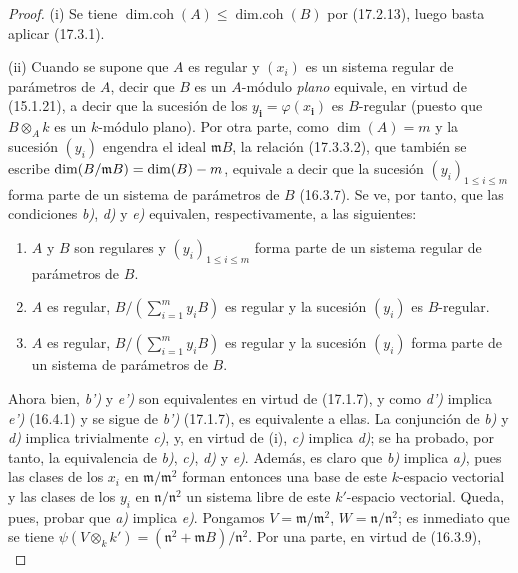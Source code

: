 \begin{proof}
\textnormal{(i)} Se tiene
$\operatorname{dim.coh}(A)\leq\operatorname{dim.coh}(B)$ por (17.2.13), luego
basta aplicar (17.3.1).

\textnormal{(ii)} Cuando se supone que $A$ es regular y $(x_i)$ es un sistema
regular de parámetros de $A$, decir que $B$ es un $A$-módulo \emph{plano}
equivale, en virtud de (15.1.21), a decir que la sucesión de los
$y_{\boldsymbol{i}}=\varphi(x_{\boldsymbol{i}})$ es $B$-regular (puesto que $B\otimes_A k$ es un
$k$-módulo plano). Por otra parte, como $\dim(A)=m$ y la sucesión $(y_i)$
engendra el ideal $\mathfrak{m}B$, la relación (17.3.3.2), que también se
escribe $\dim(B/\mathfrak{m}B)=\dim(B)- m$, equivale a decir que la sucesión
$(y_i)_{1\leq i\leq m}$ forma parte de un sistema de parámetros de $B$
(16.3.7). Se ve, por tanto, que las condiciones \emph{b)}, \emph{d)} y \emph{e)} equivalen,
respectivamente, a las siguientes:
\begin{enumerate}
  \item[\textit{b')}] $A$ y $B$ son regulares y $(y_i)_{1\leq i\leq m}$ forma
  parte de un sistema regular de parámetros de $B$.
  \item[\textit{d')}] $A$ es regular,
  $B/(\sum_{i=1}^m y_iB)$ es regular y la sucesión $(y_i)$ es
  $B$-regular.
  \item[\textit{e')}] $A$ es regular,
  $B/(\sum_{i=1}^m y_iB)$ es regular y la sucesión $(y_i)$ forma parte de un
  sistema de parámetros de $B$.
\end{enumerate}
Ahora bien, \emph{b')} y \emph{e')} son equivalentes en virtud de (17.1.7), y como \emph{d')}
implica \emph{e')} (16.4.1) y se sigue de \emph{b')} (17.1.7), es equivalente a ellas.
La conjunción
de \emph{b)} y \emph{d)} implica trivialmente \emph{c)}, y, en virtud de (i), \emph{c)} implica \emph{d)}; se ha
probado, por tanto, la equivalencia de \emph{b)}, \emph{c)}, \emph{d)} y \emph{e)}. Además, es claro que
\emph{b)} implica \emph{a)}, pues las clases de los $x_i$ en
$\mathfrak{m}/\mathfrak{m}^2$ forman entonces una base de este $k$-espacio
vectorial y las clases de los $y_i$ en $\mathfrak{n}/\mathfrak{n}^2$ un
sistema libre de este $k'$-espacio vectorial. Queda, pues, probar que \emph{a)}
implica \emph{e)}. Pongamos $V=\mathfrak{m}/\mathfrak{m}^2$,
$W=\mathfrak{n}/\mathfrak{n}^2$; es inmediato que se tiene
$\psi(V\otimes_k k')=(\mathfrak{n}^2+\mathfrak{m}B)/\mathfrak{n}^2$. Por una
parte, en virtud de (16.3.9),
\begin{equation}

\end{equation}
\end{proof}
